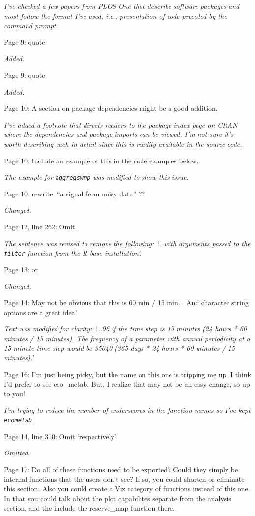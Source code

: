 \documentclass[letterpaper,12pt]{article}\usepackage[]{graphicx}\usepackage[]{color}
\begin{document}
{\it I've checked a few papers from PLOS One that describe software packages and most follow the format I've used, i.e., presentation of code preceded by the command prompt.}

Page 9: quote

{\it Added.}

Page 9: quote

{\it Added.}

Page 10: A section on package dependencies might be a good addition.

{\it I've added a footnote that directs readers to the package index page on CRAN where the dependencies and package imports can be viewed.  I'm not sure it's worth describing each in detail since this is readily available in the source code.} 

Page 10: Include an example of this in the code examples below.

{\it The example for \texttt{aggregswmp} was modified to show this issue.}

Page 10: rewrite. ``a signal from noisy data'' ??

{\it Changed.}

Page 12, line 262: Omit.

{\it The sentence was revised to remove the following: `...with arguments passed to the \texttt{filter} function from the R base installation'.}

Page 13: or

{\it Changed.}

Page 14: May not be obvious that this is 60 min / 15 min... And character string options are a great idea!

{\it Text was modified for clarity: `...96 if the time step is 15 minutes (24 hours * 60 minutes / 15 minutes).  The frequency of a parameter with annual periodicity at a 15 minute time step would be 35040 (365 days * 24 hours * 60 minutes / 15 minutes).'}

Page 16: I'm just being picky, but the name on this one is tripping me up. I think I'd prefer to see eco\_metab. But, I realize that may not be an easy change, so up to you!

{\it I'm trying to reduce the number of underscores in the function names so I've kept \texttt{ecometab}.}

Page 14, line 310: Omit `respectively'.

{\it Omitted.}

Page 17: Do all of these functions need to be exported? Could they simply be internal functions that the users don't see? If so, you could shorten or eliminate this section. Also you could create a Viz category of functions instead of this one. In that you could talk about the plot capabilites separate from the analysis section, and the include the reserve\_map function there.
\end{document}
